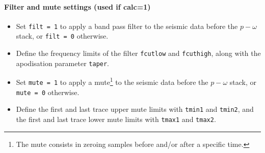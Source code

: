 \documentclass[twoside,a4paper]{article}
\begin{document}
\paragraph{Filter and mute settings (used if calc=1)}
\begin{itemize}
\setlength\itemsep{2ex}
\setlength{\parindent}{5ex}

\item Set \verb|filt = 1| to apply a band pass filter to the seismic data before the $p-\omega$ stack, or \verb|filt = 0| otherwise.

\item Define the frequency limits of the filter \verb|fcutlow| and \verb|fcuthigh|, along with the apodisation parameter \verb|taper|.

\item Set \verb|mute = 1| to apply a mute\footnote{The mute consists in zeroing samples before and/or after a specific time.} to the seismic data before the $p-\omega$ stack, or \verb|mute = 0| otherwise.

\item Define the first and last trace upper mute limits with \verb|tmin1| and \verb|tmin2|, and the first and last trace lower mute limits with \verb|tmax1| and \verb|tmax2|.
\end{itemize}
\end{document}
